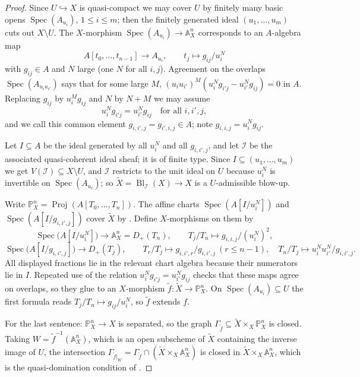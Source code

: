 \begin{proof}
  \leanok
  Since $U\hookrightarrow X$ is quasi-compact we may cover $U$ by finitely
  many basic opens $\operatorname{Spec}(A_{u_i})$, $1\le i\le m$; then the
  finitely generated ideal $(u_1,\ldots,u_m)$ cuts out $X\setminus U$.  The
  $X$-morphism $\operatorname{Spec}(A_{u_i})\to\mathbb A^n_X$ corresponds to
  an $A$-algebra map
  \[
    A[t_0,\ldots,t_{n-1}]\to A_{u_i},\qquad t_j\mapsto g_{ij}/u_i^N
  \]
  with $g_{ij}\in A$ and $N$ large (one $N$ for all $i,j$).  Agreement on the
  overlaps $\operatorname{Spec}(A_{u_iu_{i'}})$ says that for some large $M$,
  $(u_iu_{i'})^M(u_i^Ng_{i'j}-u_{i'}^Ng_{ij})=0$ in $A$.  Replacing $g_{ij}$ by
  $u_i^Mg_{ij}$ and $N$ by $N+M$ we may assume
  \[
    u_i^Ng_{i'j}=u_{i'}^Ng_{ij}\quad\text{for all }i,i',j,
  \]
  and we call this common element $g_{i,i',j}=g_{i',i,j}\in A$; note
  $g_{i,i,j}=u_i^Ng_{ij}$.

  Let $I\subseteq A$ be the ideal generated by all $u_i^N$ and all
  $g_{i,i',j}$, and let $\mathcal I$ be the associated quasi-coherent ideal
  sheaf; it is of finite type.  Since $I\subseteq(u_1,\ldots,u_m)$ we get
  $V(\mathcal I)\subseteq X\setminus U$, and $\mathcal I$ restricts to the unit
  ideal on $U$ because $u_i^N$ is invertible on
  $\operatorname{Spec}(A_{u_i})$; so $\widetilde X=\operatorname{Bl}_{\mathcal
  I}(X)\to X$ is a $U$-admissible blow-up.

  Write $\mathbb P^n_X=\operatorname{Proj}(A[T_0,\ldots,T_n])$.  The affine
  charts $\operatorname{Spec}(A[I/u_i^N])$ and
  $\operatorname{Spec}(A[I/g_{i,i',j}])$ cover $\widetilde X$ by
  .  Define $X$-morphisms on them
  by
  \[
    \operatorname{Spec}\bigl(A[I/u_i^N]\bigr)\to
      \mathbb A^n_X=D_+(T_n),\qquad
      T_j/T_n\mapsto g_{i,i,j}/(u_i^N)^2,
  \]
  \[
    \operatorname{Spec}\bigl(A[I/g_{i,i',j}]\bigr)\to D_+(T_j),\qquad
      T_r/T_j\mapsto g_{i,i',r}/g_{i,i',j}\ (r\le n-1),\quad
      T_n/T_j\mapsto u_i^Nu_{i'}^N/g_{i,i',j}.
  \]
  All displayed fractions lie in the relevant chart algebra because their
  numerators lie in $I$.  Repeated use of the relation
  $u_i^Ng_{i'j}=u_{i'}^Ng_{ij}$ checks that these maps agree on overlaps, so
  they glue to an $X$-morphism $\widetilde f\colon\widetilde X\to
  \mathbb P^n_X$.  On $\operatorname{Spec}(A_{u_i})\subseteq U$ the first
  formula reads $T_j/T_n\mapsto g_{ij}/u_i^N$, so $\widetilde f$ extends $f$.

  For the last sentence: $\mathbb P^n_X\to X$ is separated, so the graph
  $\Gamma_{\widetilde f}\subseteq\widetilde X\times_X\mathbb P^n_X$ is closed.
  Taking $W=\widetilde f^{-1}(\mathbb A^n_X)$, which is an open subscheme of
  $\widetilde X$ containing the inverse image of $U$, the intersection
  $\Gamma_{\widetilde f|_W}=\Gamma_{\widetilde f}\cap(\widetilde X\times_X
  \mathbb A^n_X)$ is closed in $\widetilde X\times_X\mathbb A^n_X$, which is
  the quasi-domination condition of
  .
\end{proof}

